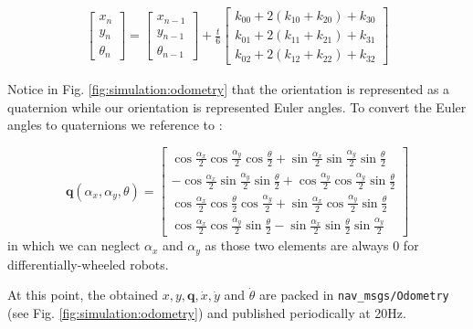 \begin{equation}
\begin{aligned}
    \begin{bmatrix}
        x_n \\
        y_n \\
        \theta_n
    \end{bmatrix} = \begin{bmatrix}
        x_{n-1} \\
        y_{n-1} \\
        \theta_{n-1}
    \end{bmatrix} + \frac{t}{6}
    \begin{bmatrix}
        k_{00} + 2 (k_{10} + k_{20}) + k_{30} \\
        k_{01} + 2 (k_{11} + k_{21}) + k_{31} \\
        k_{02} + 2 (k_{12} + k_{22}) + k_{32}
    \end{bmatrix} 
\end{aligned}
\end{equation}

Notice in Fig. \ref{fig:simulation:odometry} that the orientation is represented as a quaternion while our orientation is represented Euler angles. To convert the Euler angles to quaternions we reference to \cite[p. 12]{diebel_representing_2006}: 

\begin{equation}
    \bm{q}(\alpha_x, \alpha_y, \theta) = \begin{bmatrix}
        \cos{\frac{\alpha_x}{2}} \cos{\frac{\alpha_y}{2}} \cos{\frac{\theta}{2}} + \sin{\frac{\alpha_x}{2}} \sin{\frac{\alpha_y}{2}} \sin{\frac{\theta}{2}} \\
        -\cos{\frac{\alpha_x}{2}} \sin{\frac{\alpha_y}{2}} \sin{\frac{\theta}{2}} + \cos{\frac{\alpha_y}{2}} \cos{\frac{\alpha_y}{2}} \sin{\frac{\theta}{2}} \\
        \cos{\frac{\alpha_x}{2}} \cos{\frac{\theta}{2}} \cos{\frac{\alpha_y}{2}} + \sin{\frac{\alpha_x}{2}} \cos{\frac{\alpha_y}{2}} \sin{\frac{\theta}{2}} \\
        \cos{\frac{\alpha_x}{2}} \cos{\frac{\alpha_y}{2}} \sin{\frac{\theta}{2}} - \sin{\frac{\alpha_x}{2}} \sin{\frac{\theta}{2}} \sin{\frac{\alpha_y}{2}}
    \end{bmatrix}
\end{equation}
in which we can neglect $ \alpha_x $ and $ \alpha_y $ as those two elements are always 0 for differentially-wheeled robots.

At this point, the obtained $ x, y, \bm{q}, \dot{x}, \dot{y} $ and $ \dot{\theta} $ are packed in \texttt{nav\_msgs/Odometry} (see Fig. \ref{fig:simulation:odometry}) and published periodically at 20Hz.

